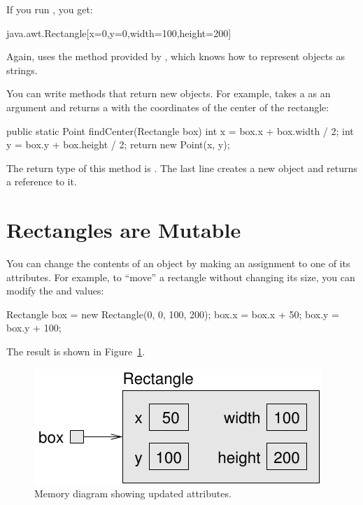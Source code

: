 If you run , you get:

\begin{stdout}
java.awt.Rectangle[x=0,y=0,width=100,height=200]
\end{stdout}

Again,  uses the  method provided by , which knows how to represent  objects as strings.


You can write methods that return new objects.
For example,  takes a  as an argument and returns a  with the coordinates of the center of the rectangle:

\begin{code}
public static Point findCenter(Rectangle box) {
    int x = box.x + box.width / 2;
    int y = box.y + box.height / 2;
    return new Point(x, y);
}
\end{code}

The return type of this method is .
The last line creates a new  object and returns a reference to it.


\section{Rectangles are Mutable}


You can change the contents of an object by making an assignment to one of its attributes.
For example, to ``move'' a rectangle without changing its size, you can modify the  and  values:

\begin{code}
Rectangle box = new Rectangle(0, 0, 100, 200);
box.x = box.x + 50;
box.y = box.y + 100;
\end{code}

The result is shown in Figure~\ref{fig.rectangle2}.

\begin{figure}[!ht]
\begin{center}
\includegraphics{figs/rectangle2.pdf}
\caption{Memory diagram showing updated attributes.}
\label{fig.rectangle2}
\end{center}
\end{figure}

